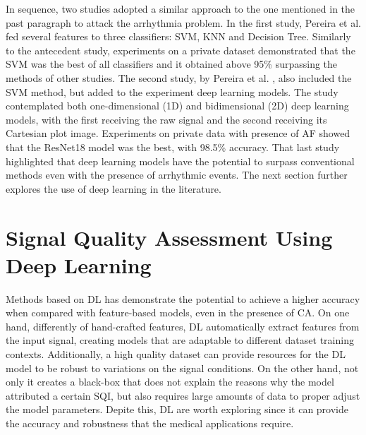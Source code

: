 In sequence, two studies adopted a similar approach to the one mentioned in the past paragraph to attack the arrhythmia problem. In the first study, Pereira et al. \cite{arrhythmia-3} fed several features to three classifiers: \gls{SVM}, \gls{KNN} and Decision Tree. Similarly to the antecedent study, experiments on a private dataset demonstrated that the \gls{SVM} was the best of all classifiers and it obtained above 95\% surpassing the methods of other studies. The second study, by Pereira et al. \cite{arrhythmia-4}, also included the \gls{SVM} method, but added to the experiment deep learning models. The study contemplated both one-dimensional (1D) and bidimensional (2D) deep learning models, with the first receiving the raw signal and the second receiving its Cartesian plot image. Experiments on private data with presence of \gls{AF} showed that the ResNet18 model was the best, with 98.5\% accuracy. That last study highlighted that deep learning models have the potential to surpass conventional methods even with the presence of arrhythmic events. The next section further explores the use of deep learning in the literature.  

\section{Signal Quality Assessment Using Deep Learning}
\label{sec:deep_learning}

Methods based on \gls{DL} has demonstrate the potential to achieve a higher accuracy when compared with feature-based models, even in the presence of \gls{CA}. On one hand, differently of hand-crafted features, \gls{DL} automatically extract features from the input signal, creating models that are adaptable to different dataset training contexts. Additionally, a high quality dataset can provide resources for the \gls{DL} model to be robust to variations on the signal conditions. On the other hand, not only it creates a black-box that does not explain the reasons why the model attributed a certain \gls{SQI}, but also requires large amounts of data to proper adjust the model parameters. Depite this, \gls{DL} are worth exploring since it can provide the accuracy and robustness that the medical applications require. 

